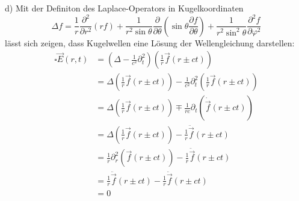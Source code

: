 \documentclass[11pt a4paper]{article}
\newcommand{\delt}{\partial_t}
\newcommand{\del}{\partial}
\begin{document}
d) Mit der Definiton des Laplace-Operators in Kugelkoordinaten
\[ \Delta f =  \frac{1}{r} \frac{\partial^2}{\partial r^2} (rf) + \frac{1}{r^2 \sin \theta} \frac{\partial}{\partial \theta} \left(\sin \theta \frac{\partial f}{\partial \theta} \right) + \frac{1}{r^2 \sin^2 \theta} \frac{\partial^2 f}{\partial \varphi^2} \]
lässt sich zeigen, dass Kugelwellen eine Lösung der Wellengleichung darstellen:
\begin{align*}
	\square \vec E(r,t)
	&= \left(\Delta - \frac{1}{c^2} \delt^2 \right) \left( \frac 1r \vec f(r \pm ct) \right) \\
	&= \Delta  \left( \frac 1r \vec f(r \pm ct) \right) 
	- \frac{1}{c^2} \delt^2 \left( \frac 1r \vec f(r \pm ct) \right) \\
	&= \Delta  \left( \frac 1r \vec f(r \pm ct) \right) 
	\mp \frac{1}{rc} \delt \left( \dot{\vec f}(r \pm ct) \right) \\
	&= \Delta  \left( \frac 1r \vec f(r \pm ct) \right) 
	- \frac{1}{r} \ddot{\vec f}(r \pm ct) \\
	&= \frac{1}{r} \del_r^2 \left(\vec f(r \pm ct) \right) 
	- \frac{1}{r} \ddot{\vec f}(r \pm ct) \\
	&= \frac{1}{r} \ddot{\vec f}(r \pm ct)
	- \frac{1}{r} \ddot{\vec f}(r \pm ct) \\
	&= 0
\end{align*}

\newpage
\setlength{\headheight}{0cm}
\end{document}
